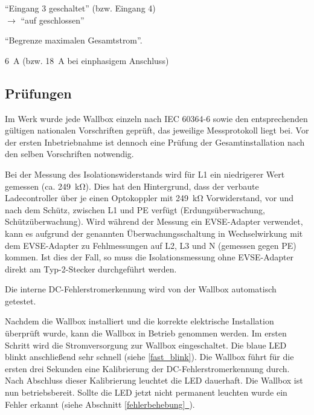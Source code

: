 \documentclass[a4paper,10pt]{article}
\newcommand*{\fullref}[1]{Abschnitt \hyperref[{#1}]{\ref*{#1}~\nameref*{#1}}}
\begin{document}
\begin{multicols*}{2}
    \begin{description}[labelindent=0.5cm]
        \item[Bedingung] \enquote{Eingang 3 geschaltet} (bzw. Eingang 4)\\\hspace{-0.5cm} $\rightarrow$ \enquote{auf geschlossen}
        \item[Aktion] \enquote{Begrenze maximalen Gesamtstrom}.
        \item[Maximaler Gesamtstrom] \SI{6}{\ampere} (bzw. \SI{18}{\ampere} bei einphasigem Anschluss)
    \end{description}

    \vspace{-0.2cm}
    \subsection{Prüfungen}\label{tests}
    \vspace{-0.1cm}
    Im Werk wurde jede Wallbox einzeln nach IEC 60364-6 sowie den entsprechenden gültigen
    nationalen Vorschriften geprüft, das jeweilige Messprotokoll liegt bei.
    Vor der ersten Inbetriebnahme ist dennoch eine Prüfung der Gesamtinstallation
    nach den selben Vorschriften notwendig.

    Bei der Messung des Isolationswiderstands wird für L1 ein niedrigerer Wert
    gemessen (ca. \SI{249}{\kilo\ohm}). Dies hat den Hintergrund, dass
    der verbaute Ladecontroller über je einen Optokoppler mit
    \SI{249}{\kilo\ohm} Vorwiderstand, vor und nach dem Schütz, zwischen L1 und
    PE verfügt (Erdungsüberwachung, Schützüberwachung). Wird während der Messung ein EVSE-Adapter verwendet,
    kann es aufgrund der genannten Überwachungsschaltung in Wechselwirkung mit dem EVSE-Adapter zu Fehlmessungen
    auf L2, L3 und N (gemessen gegen PE) kommen. Ist dies der Fall, so muss die Isolationsmessung
    ohne EVSE-Adapter direkt am Typ-2-Stecker durchgeführt werden.

    Die interne DC-Fehlerstromerkennung wird von der Wallbox automatisch getestet.

    Nachdem die Wallbox installiert
    und die korrekte elektrische Installation überprüft wurde, kann die Wallbox in
    Betrieb genommen werden.
    Im ersten Schritt wird die Stromversorgung zur Wallbox eingeschaltet. Die
    blaue LED blinkt anschließend sehr schnell (siehe \ref{fast_blink}). Die Wallbox führt
    für die ersten drei Sekunden eine Kalibrierung der
    DC-Fehlerstromerkennung durch. Nach Abschluss dieser Kalibrierung
    leuchtet die LED dauerhaft. Die Wallbox ist nun betriebsbereit. Sollte die LED jetzt
    nicht permanent leuchten wurde ein Fehler erkannt (siehe \fullref{fehlerbehebung}).


\end{multicols*}
\end{document}
